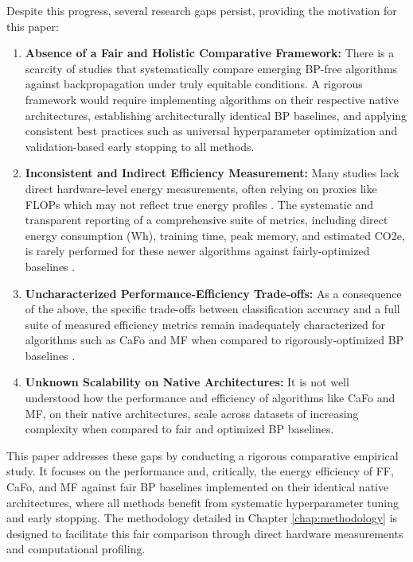 Despite this progress, several research gaps persist, providing the motivation for this paper:
\begin{enumerate}
\item \textbf{Absence of a Fair and Holistic Comparative Framework:} There is a scarcity of studies that systematically compare emerging BP-free algorithms against backpropagation under truly equitable conditions. A rigorous framework would require implementing algorithms on their respective native architectures, establishing architecturally identical BP baselines, and applying consistent best practices such as universal hyperparameter optimization and validation-based early stopping to all methods.
\item \textbf{Inconsistent and Indirect Efficiency Measurement:} Many studies lack direct hardware-level energy measurements, often relying on proxies like FLOPs which may not reflect true energy profiles \cite{charpentier2023accuracy}. The systematic and transparent reporting of a comprehensive suite of metrics, including direct energy consumption (Wh), training time, peak memory, and estimated CO2e, is rarely performed for these newer algorithms against fairly-optimized baselines \cite{henderson2020towards}.
\item \textbf{Uncharacterized Performance-Efficiency Trade-offs:} As a consequence of the above, the specific trade-offs between classification accuracy and a full suite of measured efficiency metrics remain inadequately characterized for algorithms such as CaFo and MF when compared to rigorously-optimized BP baselines \cite{narayanagowda2023watt, yarally2023uncovering}.
\item \textbf{Unknown Scalability on Native Architectures:} It is not well understood how the performance and efficiency of algorithms like CaFo and MF, on their native architectures, scale across datasets of increasing complexity when compared to fair and optimized BP baselines.
\end{enumerate}
This paper addresses these gaps by conducting a rigorous comparative empirical study. It focuses on the performance and, critically, the energy efficiency of FF, CaFo, and MF against fair BP baselines implemented on their identical native architectures, where all methods benefit from systematic hyperparameter tuning and early stopping. The methodology detailed in Chapter \ref{chap:methodology} is designed to facilitate this fair comparison through direct hardware measurements and computational profiling.